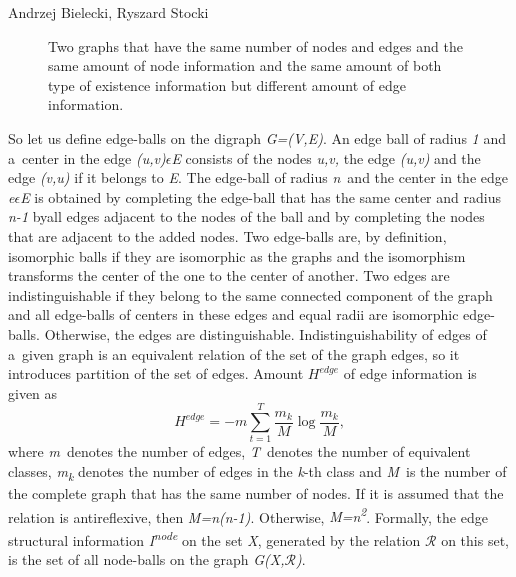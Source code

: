 \begin{artengenv2auth}{Andrzej Bielecki, Ryszard Stocki}
\begin{figure}[htbp]
 \caption{Two graphs that have the same number of nodes and edges and the same amount of node information and the same amount of both type of existence information but different amount of edge information.}
 \label{bie:fig2}
\end{figure}






So let us define edge-balls on the digraph \textit{G=(V,E)}. An edge ball of radius \textit{1} and a~center in the edge \textit{(u,v)$\epsilon $E} consists of the nodes \textit{u,v,} the edge \textit{(u,v)} and the edge \textit{(v,u)} if it belongs to \textit{E}. The edge-ball of radius \textit{n}~and the center in the edge \textit{e$\epsilon $E} is obtained by completing the edge-ball that has the same center and radius \textit{n-1} by\linebreak all edges adjacent to the nodes of the ball and by completing the nodes that are adjacent to the added nodes. Two edge-balls are, by definition, isomorphic balls if they are isomorphic as the graphs and the isomorphism transforms the center of the one to the center of another. Two edges are indistinguishable if they belong to the same connected component of the graph and all edge-balls of centers in these edges and equal radii are isomorphic edge-balls. Otherwise, the edges are distinguishable. Indistinguishability of edges of a~given graph is an equivalent relation of the set of the graph edges, so it introduces partition of the set of edges. Amount $H^{\textit{edge}}$ of edge information is given as
\begingroup
\reqnos
\begin{equation}
H^{\textit{edge}}=-m\sum _{t=1}^T\frac{m_k} M\log \frac{m_k} M,
\end{equation}
\endgroup
where \textit{m}~denotes the number of edges, \textit{T}~denotes the number of equivalent classes, \textit{m}\textit{\textsubscript{k}} denotes the number of edges in the \textit{k}{}-th class and \textit{M}~is the number of the complete graph that has the same number of nodes. If it is assumed that the relation is antireflexive, then \textit{M=n(n-1)}. Otherwise, \textit{M=n}\textit{\textsuperscript{2}}.  Formally, the edge structural information \textit{I}\textit{\textsuperscript{node}} on the set \textit{X}, generated by the relation $\mathcal{R}$ on this set, is the set of all node-balls on the graph \textit{G(X,$\mathcal{R}$)}.




\end{artengenv2auth}
